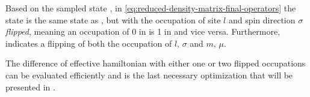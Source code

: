 Based on the sampled state \ketN[N], in \autoref{eq:reduced-density-matrix-final-operators} the state  is the same state as \ketN[N], but with the occupation of site $l$ and spin direction $\sigma$ \emph{flipped}, meaning an occupation of 0 in \ketN[N] is 1 in  and vice versa.
Furthermore,  indicates a flipping of both the occupation of $l,\, \sigma$ and $m,\, \mu$.

The difference of effective hamiltonian with either one or two flipped occupations can be evaluated efficiently and is the last necessary optimization that will be presented in .